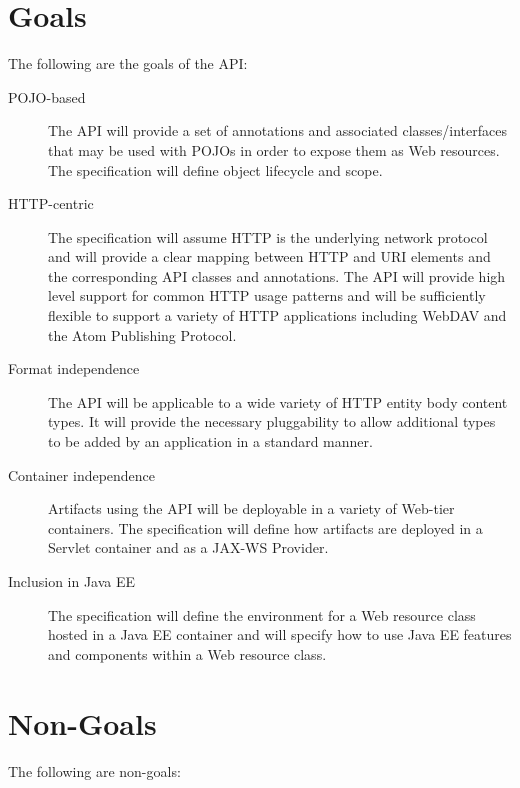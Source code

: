 \section{Goals}

The following are the goals of the API:

\begin{description}

\item[POJO-based] The API will provide a set of annotations and associated classes/interfaces that may be used with POJOs in order to expose them as Web resources. The specification will define object lifecycle and scope.

\item[HTTP-centric] The specification will assume HTTP\cite{http11} is the underlying network protocol and will provide a clear mapping between HTTP and URI\cite{uri} elements and the corresponding API classes and annotations. The API will provide high level support for common HTTP usage patterns and will be sufficiently flexible to support a variety of HTTP applications including WebDAV\cite{webdav} and the Atom Publishing Protocol\cite{atompub}.

\item[Format independence] The API will be applicable to a wide variety of HTTP entity body content types. It will provide the necessary pluggability to allow additional types to be added by an application in a standard manner.

\item[Container independence] Artifacts using the API will be deployable in a variety of Web-tier containers. The specification will define how artifacts are deployed in a Servlet\cite{servlet} container and as a JAX-WS\cite{jsr224} Provider.

\item[Inclusion in Java EE] The specification will define the environment for a Web resource class hosted in a Java EE container and will specify how to use Java EE features and components within a Web resource class.

\end{description}

\section{Non-Goals}
\label{non_goals}

The following are non-goals:


